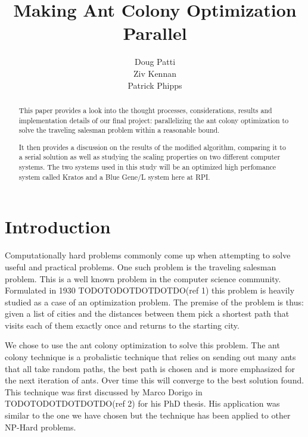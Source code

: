\documentclass{acm_proc_article-sp}
\begin{document}
\title{Making Ant Colony Optimization Parallel}


\author{
\alignauthor
Doug Patti\\
\alignauthor
Ziv Kennan\\
\alignauthor Patrick Phipps\\
}

\maketitle
\begin{abstract}

This paper provides a look into the thought processes, considerations, results and
implementation details of our final project: parallelizing the ant colony 
optimization to solve the traveling salesman problem within a reasonable bound. 

It then provides a discussion on the results of the modified algorithm,
comparing it to a serial solution as well as studying the scaling properties
on two different computer systems. The two systems used in this study will be
an optimized high perfomance system called Kratos and a Blue Gene/L system here
at RPI.

\end{abstract}



\section{Introduction}
Computationally hard problems commonly come up when attempting to solve
useful and practical problems. One such problem is the traveling salesman 
problem. This is a well known problem in the computer science community. Formulated
in 1930 TODOTODOTDOTDOTDO(ref 1) this problem is heavily studied as a case of an optimization problem.
The premise of the problem is thus: given a list of cities and the distances
between them pick a shortest path that visits each of them exactly once and
returns to the starting city. 

We chose to use the ant colony optimization to solve this problem. The ant colony
technique is a probalistic technique that relies on sending out many ants that
all take random paths, the best path is chosen and is more emphasized for
the next iteration of ants. Over time this will converge to the best
solution found. This technique was first discussed by Marco Dorigo in  TODOTODOTDOTDOTDO(ref 2) for his
PhD thesis. His application was similar to the one we have chosen but the technique
has been applied to other NP-Hard problems.
\end{document}
